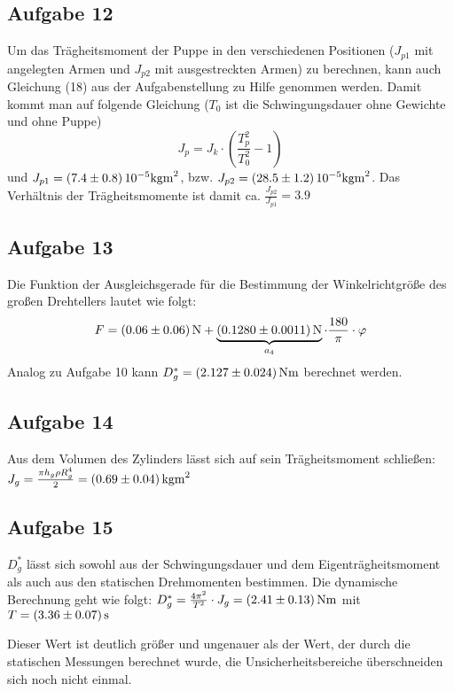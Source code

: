 \documentclass[a4paper,11pt,ngerman]{scrartcl}
\begin{document}
\subsection{Aufgabe 12}\label{sub:A12}
Um das Trägheitsmoment der Puppe in den verschiedenen Positionen ($J_{p1}$ mit angelegten Armen und $J_{p2}$ mit ausgestreckten Armen) zu berechnen, kann auch Gleichung (18) aus der Aufgabenstellung zu Hilfe genommen werden. Damit kommt man auf folgende Gleichung ($T_0$ ist die Schwingungsdauer ohne Gewichte und ohne Puppe)
\begin{equation}\label{equ:TraegheitsmomentPuppe}
J_p = J_k \cdot \left(\frac{T_p^2}{T_0^2} - 1\right)
\end{equation}
und $J_{p1} = \SI{7.4 \pm 0.8}{10^{-5}kgm^2}$, bzw. $J_{p2} = \SI{28.5 \pm 1.2}{10^{-5}kgm^2}$. Das Verhältnis der Trägheitsmomente ist damit ca. $\frac{J_{p2}}{J_{p1}} = 3.9$

\subsection{Aufgabe 13}

Die Funktion der Ausgleichsgerade für die Bestimmung der Winkelrichtgröße des großen Drehtellers lautet wie folgt:
\begin{equation}
F = \SI{0.06 \pm 0.06}{N} + \underbrace{\SI{0.1280 \pm 0.0011}{N}}_{a_4} \cdot \frac{180}{\pi} \cdot \varphi
\end{equation}
Analog zu Aufgabe 10 kann $D^*_g = \SI{2.127 \pm 0.024}{Nm}$ berechnet werden.

\subsection{Aufgabe 14}
Aus dem Volumen des Zylinders lässt sich auf sein Trägheitsmoment schließen: $J_g = \frac{\pi h_g \rho R_g^4}{2} = \SI{0.69 \pm 0.04}{kgm^2}$

\subsection{Aufgabe 15}
$D^*_g$ lässt sich sowohl aus der Schwingungsdauer und dem Eigenträgheitsmoment als auch aus den statischen Drehmomenten bestimmen. Die dynamische Berechnung geht wie folgt: $D^*_g = \frac{4\pi^2}{T^2} \cdot J_g = \SI{2.41 \pm 0.13}{Nm}$ mit $T = \SI{3.36 \pm 0.07}{s}$

Dieser Wert ist deutlich größer und ungenauer als der Wert, der durch die statischen Messungen berechnet wurde, die Unsicherheitsbereiche überschneiden sich noch nicht einmal.
\end{document}
